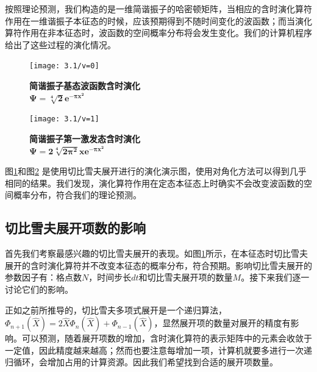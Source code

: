 按照理论预测，我们构造的是一维简谐振子的哈密顿矩阵，当相应的含时演化算符作用在一维谐振子本征态的时候，应该预期得到不随时间变化的波函数；而当演化算符作用在非本征态时，波函数的空间概率分布将会发生变化。我们的计算机程序给出了这些过程的演化情况。
\begin{figure}[hbt]
  \centering
  \captionsetup{justification=centering}
  \vspace{1mm}
  \texttt{[image: 3.1/v=0]}
  \caption{\textbf{简谐振子基态波函数含时演化} \\
            $\boldsymbol{\Psi = \sqrt[4]{2}e^{-\pi x^2}}$ \label{fig:prop1}}
\end{figure}

\begin{figure}[hbt]
  \centering
  \captionsetup{justification=centering}
  \vspace{1mm}
  \texttt{[image: 3.1/v=1]} 
  \caption{\textbf{简谐振子第一激发态含时演化}\\
            $\boldsymbol{\Psi = 2\sqrt[4]{2\pi^2}x e^{-\pi x^2}}$  \label{fig:prop2}}
\end{figure}

图\ref{fig:prop1}和图\ref{fig:prop2} 是使用切比雪夫展开进行的演化演示图，使用对角化方法可以得到几乎相同的结果。我们发现，演化算符作用在定态本征态上时确实不会改变波函数的空间概率分布，符合我们的理论预测。


\subsection{切比雪夫展开项数的影响}
首先我们考察最感兴趣的切比雪夫展开的表现。如图\ref{fig:prop1}所示，在本征态时切比雪夫展开的含时演化算符并不改变本征态的概率分布，符合预期。影响切比雪夫展开的参数因子有：格点数$N$，时间步长$dt$和切比雪夫展开项的数量$M$。接下来我们逐一讨论它们的影响。

正如之前所推导的，切比雪夫多项式展开是一个递归算法，$\Phi_{n+1}(\hat{X}) = 2\hat{X}\Phi_{n}(\hat{X}) + \Phi_{n-1}(\hat{X})$，显然展开项的数量对展开的精度有影响。可以预测，随着展开项数的增加，含时演化算符的表示矩阵中的元素会收敛于一定值，因此精度越来越高；然而也要注意每增加一项，计算机就要多进行一次递归循环，会增加占用的计算资源。因此我们希望找到合适的展开项数量。

